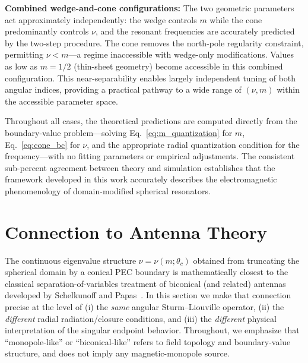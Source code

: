\documentclass[
  aip,
  amsmath,amssymb,
  preprint
]{revtex4-1}
\begin{document}
\textbf{Combined wedge-and-cone configurations:} The two geometric parameters act approximately independently: the wedge controls $m$ while the cone predominantly controls $\nu$, and the resonant frequencies are accurately predicted by the two-step procedure. The cone removes the north-pole regularity constraint, permitting $\nu < m$---a regime inaccessible with wedge-only modifications. Values as low as $m = 1/2$ (thin-sheet geometry) become accessible in this combined configuration. This near-separability enables largely independent tuning of both angular indices, providing a practical pathway to a wide range of $(\nu, m)$ within the accessible parameter space.

Throughout all cases, the theoretical predictions are computed directly from the boundary-value problem---solving Eq.~\eqref{eq:m_quantization} for $m$, Eq.~\eqref{eq:cone_bc} for $\nu$, and the appropriate radial quantization condition for the frequency---with no fitting parameters or empirical adjustments. The consistent sub-percent agreement between theory and simulation establishes that the framework developed in this work accurately describes the electromagnetic phenomenology of domain-modified spherical resonators.


\section{Connection to Antenna Theory}
\label{antenna}
The continuous eigenvalue structure $\nu=\nu(m;\theta_c)$ obtained from truncating the spherical domain by a conical PEC boundary is mathematically closest to the classical separation-of-variables treatment of biconical (and related) antennas developed by Schelkunoff and Papas~\cite{Schelkunoff1943,Papas1950}. In this section we make that connection precise at the level of (i) the \emph{same} angular Sturm--Liouville operator, (ii) the \emph{different} radial radiation/closure conditions, and (iii) the \emph{different} physical interpretation of the singular endpoint behavior. Throughout, we emphasize that ``monopole-like'' or ``biconical-like'' refers to field topology and boundary-value structure, and does not imply any magnetic-monopole source.
\end{document}
